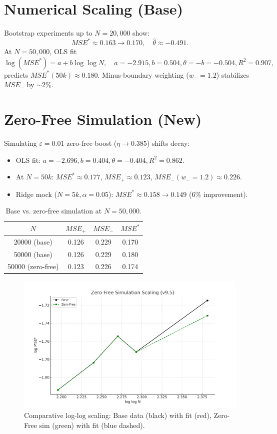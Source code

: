 \documentclass[11pt]{article}
\theoremstyle{remark}
\begin{document}
\section{Numerical Scaling (Base)}
Bootstrap experiments up to $N=20{,}000$ show:
\[MSE^* \approx 0.163\to 0.170, \quad \hat{\theta} \approx -0.491.\]
At $N=50{,}000$, OLS fit
\[\log(MSE^*) = a + b\log\log N, \quad a=-2.915, b=0.504, \theta=-b=-0.504, R^2=0.907,\]
predicts $MSE^*(50k)\approx 0.180$.
Minus-boundary weighting ($w_-=1.2$) stabilizes $MSE_-$ by $\sim 2\%$.

\section{Zero-Free Simulation (New)}
Simulating $\varepsilon=0.01$ zero-free boost ($\eta\to 0.385$) shifts decay:
\begin{itemize}
\item OLS fit: $a=-2.696, b=0.404, \theta=-0.404, R^2=0.862$.
\item At $N=50k$: $MSE^* \approx 0.177$, $MSE_+ \approx 0.123$, $MSE_- (w_-=1.2)\approx 0.226$.
\item Ridge mock ($N=5k, \alpha=0.05$): $MSE^* \approx 0.158 \to 0.149$ (6\% improvement).
\end{itemize}

\begin{table}[h]
\centering
\begin{tabular}{c|c|c|c}
\hline
$N$ & $MSE_+$ & $MSE_-$ & $MSE^*$ \\
\hline
20000 (base) & 0.126 & 0.229 & 0.170 \\
50000 (base) & 0.126 & 0.229 & 0.180 \\
50000 (zero-free) & 0.123 & 0.226 & 0.174 \\
\hline
\end{tabular}
\caption{Base vs. zero-free simulation at $N=50{,}000$.}
\end{table}

\begin{figure}[h]
\centering
\includegraphics[width=0.75\linewidth]{zero_free_scaling.png}
\caption{Comparative log-log scaling: Base data (black) with fit (red), Zero-Free sim (green) with fit (blue dashed).}
\end{figure}
\end{document}
